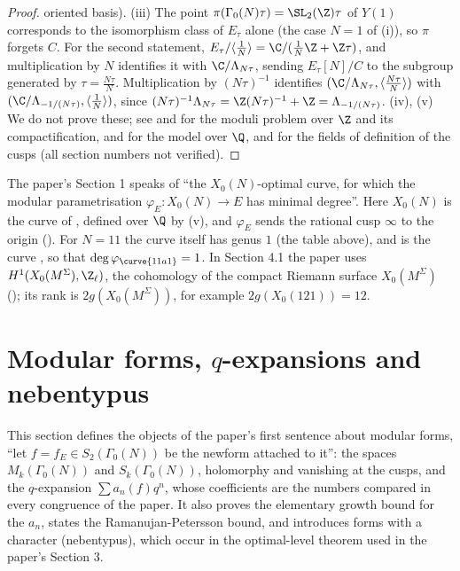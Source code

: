 \begin{proof}
oriented basis).
(iii) The point $\pi(\Gamma_0(N)\tau)=\SL_2(\Z)\tau$ of $Y(1)$ corresponds to the isomorphism class of $E_\tau$ alone (the case $N=1$ of (i)), so $\pi$ forgets $C$. For the second statement, $E_\tau/\langle\frac1N\rangle=\C/(\frac1N\Z+\Z\tau)$, and multiplication by $N$ identifies it with $\C/\Lambda_{N\tau}$, sending $E_\tau[N]/C$ to the
subgroup generated by $\tau=\frac{N\tau}N$. Multiplication by $(N\tau)^{-1}$ identifies $(\C/\Lambda_{N\tau},\langle\frac{N\tau}N\rangle)$ with $(\C/\Lambda_{-1/(N\tau)},\langle\frac1N\rangle)$,
since $(N\tau)^{-1}\Lambda_{N\tau}=\Z(N\tau)^{-1}+\Z=\Lambda_{-1/(N\tau)}$.
(iv), (v) We do not prove these; see \cite{DeligneRapoport73} and \cite{KatzMazur85} for the moduli problem over $\Z$ and its compactification,
\cite[Sections 7.7 and 1.5]{DiamondShurman} and \cite[Section 6.7]{Shimura71} for the model over $\Q$, and \cite{Ogg73} for the fields of definition of the cusps (all
section numbers not verified).
\end{proof}

\begin{paperlink}\label{pl:modforms:x0}
The paper's Section 1 speaks of ``the $X_0(N)$-optimal curve, for which the modular parametrisation $\varphi_E\colon X_0(N)\to E$ has minimal degree''. Here $X_0(N)$ is
the curve of , defined over $\Q$ by (v), and $\varphi_E$ sends the rational cusp $\infty$ to the origin
(). For $N=11$ the curve itself has genus $1$ (the table above), and is the curve , so that $\deg\varphi_{\curve{11a1}}=1$. In Section 4.1
the paper uses $H^1(X_0(M^\Sigma),\Z_\ell)$, the cohomology of the compact Riemann surface $X_0(M^\Sigma)$ (); its rank is $2g(X_0(M^\Sigma))$, for example
$2g(X_0(121))=12$.
\end{paperlink}

\section{Modular forms, \texorpdfstring{$q$}{q}-expansions and nebentypus}\label{sec:modforms:forms}

This section defines the objects of the paper's first sentence about modular forms, ``let $f=f_E\in S_2(\Gamma_0(N))$ be the newform attached to it'': the
spaces $M_k(\Gamma_0(N))$ and $S_k(\Gamma_0(N))$, holomorphy and vanishing at the cusps, and the $q$-expansion $\sum a_n(f)q^n$, whose coefficients are the numbers
compared in every congruence of the paper. It also proves the elementary growth bound for the $a_n$, states the Ramanujan-Petersson bound, and
introduces forms with a character (nebentypus), which occur in the optimal-level theorem used in the paper's Section 3.

